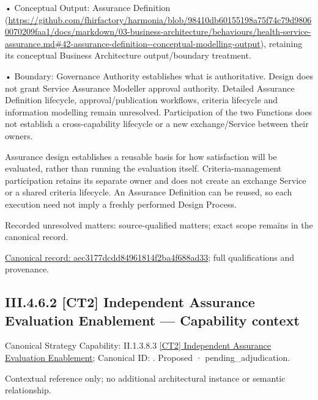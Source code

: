 •
Conceptual Output: Assurance Definition (\url{https://github.com/fhirfactory/harmonia/blob/98410db60155198a75f74c79d98060070209faa1/docs/markdown/03-business-architecture/behaviours/health-service-assurance.md#42-assurance-definition--conceptual-modelling-output}), retaining its conceptual Business Architecture output/boundary treatment.



•
Boundary: Governance Authority establishes what is authoritative. Design does not grant Service Assurance Modeller approval authority. Detailed Assurance Definition lifecycle, approval/publication workflows, criteria lifecycle and information modelling remain unresolved. Participation of the two Functions does not establish a cross-capability lifecycle or a new exchange/Service between their owners.



Assurance design establishes a reusable basis for how satisfaction will be evaluated, rather than running the evaluation itself. Criteria-management participation retains its separate owner and does not create an exchange Service or a shared criteria lifecycle. An Assurance Definition can be reused, so each execution need not imply a freshly performed Design Process.


{\small Recorded unresolved matters: source-qualified matters; exact scope remains in the canonical record.}\par
{\footnotesize \href{../../../../../../../continuum/business/business-process/aec3177dcdd84961814f2ba4f688ad33.md}{Canonical record: aec3177dcdd84961814f2ba4f688ad33}; full qualifications and provenance.}\par
\subsection*{III.4.6.2 [CT2] Independent Assurance Evaluation Enablement — Capability context}
\label{navigation:III.4.6.2}

{\small Canonical Strategy Capability: II.1.3.8.3 \hyperref[element:7fa5112efb724b90a17a03c7c19c516a]{[CT2] Independent Assurance Evaluation Enablement}; Canonical ID: \texttt{}. Proposed · pending\_adjudication.}\par
Contextual reference only; no additional architectural instance or semantic relationship.\par
